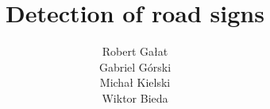 \usepackage{cite}
\usepackage{polski}
\usepackage[utf8]{inputenc}
\usepackage{array}
\usepackage{hyperref}
\usepackage{graphicx}
\usepackage{listings}

\title{Detection of road signs}
\author{Robert Gałat\\ Gabriel Górski \\ Michał Kielski\\ Wiktor Bieda}

